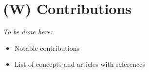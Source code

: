 \section{(W) Contributions}\label{s:Contributions}
    \emph{To be done here:}
    \begin{itemize}
        \item  Notable contributions
        \item List of concepts and articles with references
    \end{itemize}